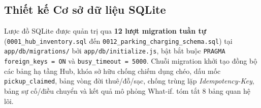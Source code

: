 \subsection{Thiết kế Cơ sở dữ liệu SQLite}

Lược đồ SQLite được quản trị qua \textbf{12 lượt migration tuần tự} (\texttt{0001\_hub\_inventory.sql} đến \texttt{0012\_parking\_charging\_schema.sql}) tại \texttt{app/db/migrations/} bởi \texttt{app/db/initialize.js}, bật bắt buộc \texttt{PRAGMA foreign\_keys = ON} và \texttt{busy\_timeout = 5000}. Chuỗi migration khởi tạo đồng bộ các bảng hạ tầng Hub, khóa sở hữu chống chiếm dụng chéo, dấu mốc \texttt{pickup\_claimed}, bảng vòng đời thuê/đỗ/sạc, chống trùng lặp \textit{Idempotency-Key}, bảng sự cố/điều chuyển và kết quả mô phỏng What-if.  tóm tắt 8 bảng quan hệ lõi.

